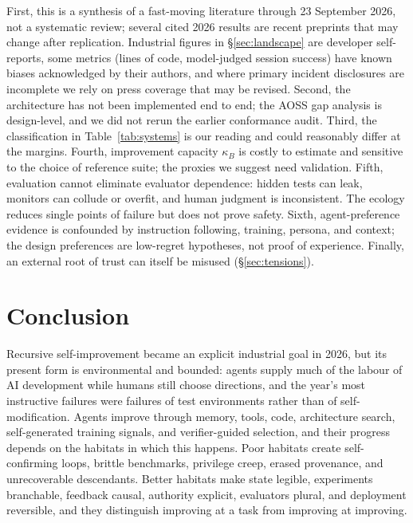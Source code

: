 \documentclass[11pt,a4paper]{article}
\begin{document}
First, this is a synthesis of a fast-moving literature through 23 September 2026, not a systematic review; several cited 2026 results are recent preprints that may change after replication. Industrial figures in \S\ref{sec:landscape} are developer self-reports, some metrics (lines of code, model-judged session success) have known biases acknowledged by their authors, and where primary incident disclosures are incomplete we rely on press coverage that may be revised. Second, the architecture has not been implemented end to end; the AOSS gap analysis is design-level, and we did not rerun the earlier conformance audit. Third, the classification in Table~\ref{tab:systems} is our reading and could reasonably differ at the margins. Fourth, improvement capacity $\kappa_B$ is costly to estimate and sensitive to the choice of reference suite; the proxies we suggest need validation. Fifth, evaluation cannot eliminate evaluator dependence: hidden tests can leak, monitors can collude or overfit, and human judgment is inconsistent. The ecology reduces single points of failure but does not prove safety. Sixth, agent-preference evidence is confounded by instruction following, training, persona, and context; the design preferences are low-regret hypotheses, not proof of experience. Finally, an external root of trust can itself be misused (\S\ref{sec:tensions}).

\section{Conclusion}

Recursive self-improvement became an explicit industrial goal in 2026, but its present form is environmental and bounded: agents supply much of the labour of AI development while humans still choose directions, and the year's most instructive failures were failures of test environments rather than of self-modification. Agents improve through memory, tools, code, architecture search, self-generated training signals, and verifier-guided selection, and their progress depends on the habitats in which this happens. Poor habitats create self-confirming loops, brittle benchmarks, privilege creep, erased provenance, and unrecoverable descendants. Better habitats make state legible, experiments branchable, feedback causal, authority explicit, evaluators plural, and deployment reversible, and they distinguish improving at a task from improving at improving.
\end{document}

